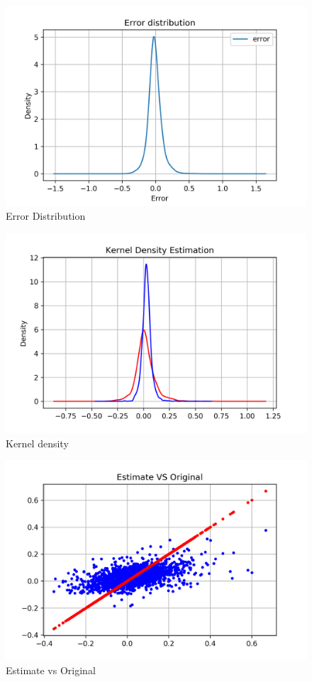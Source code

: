 \begin{figure}
	\centering
	\includegraphics[width=1\linewidth]{Figure/svmr_errordist.png}
	\caption{Error Distribution} 
	\label{fig:TestDataSet}
\end{figure}

\begin{figure}
	\centering
	\includegraphics[width=1\linewidth]{Figure/svmr_kerneldensity.png}
	\caption{Kernel density} 
	\label{fig:TestDataSet}
\end{figure}

\begin{figure}
	\centering
	\includegraphics[width=1\linewidth]{Figure/svmr_estiorg.png}
	\caption{Estimate vs Original} 
	\label{fig:TestDataSet}
\end{figure}